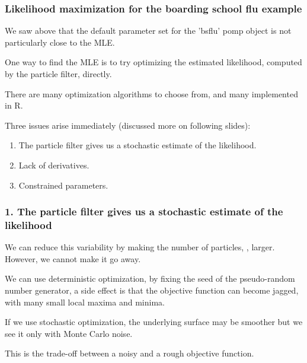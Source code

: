 \documentclass{beamer}\usepackage[]{graphicx}\usepackage[]{color}
\begin{document}
\begin{frame}[fragile]




\end{frame}

\begin{frame}[fragile]

\frametitle{Likelihood maximization for the boarding school flu example}
\bi
\item  We saw above that the default parameter set for the 'bsflu' pomp object is not particularly close to the MLE.

\item  One way to find the MLE is to try optimizing the estimated likelihood, computed by the particle filter, directly.

\item  There are many optimization algorithms to choose from, and many implemented in R.

\item  Three issues arise immediately (discussed more on following slides):
\ei

\begin{enumerate}

\item The particle filter gives us a stochastic estimate of the likelihood.

\item Lack of derivatives.

\item Constrained parameters.

\end{enumerate}

\end{frame}  

\begin{frame}[fragile]
\frametitle{1. The particle filter gives us a stochastic estimate of the likelihood}
\bi
\item  We can reduce this variability by making the number of particles, , larger. 
However, we cannot make it go away.
\item  We can use deterministic optimization, by fixing the seed of the pseudo-random number generator, a side effect is that the objective function can become jagged, with many small local maxima and minima.
\item If we use stochastic optimization, the underlying surface may be smoother but we see it only with Monte Carlo noise.
\item 
This is the trade-off between a noisy and a rough objective function.
\ei
\end{frame}
\end{document}
